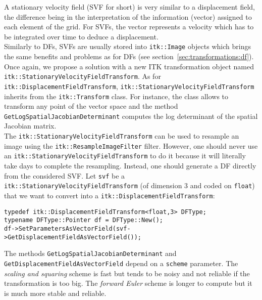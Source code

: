 A stationary velocity field (SVF for short) is very similar to a displacement field, the difference being in the interpretation of the information (vector) assigned to each element of the grid. For SVFs, the vector represents a velocity which has to be integrated over time to deduce a displacement.
\\
Similarly to DFs, SVFs are usually stored into \texttt{itk::Image} objects which brings the same benefits and problems as for DFs (see section~\ref{sec:transformations:df}). Once again, we propose a solution with a new ITK transformation object named \texttt{itk::\-Stationary\-Velocity\-Field\-Transform}. As for \texttt{itk::\-Displacement\-Field\-Transform}, \texttt{itk::\-Stationary\-Velocity\-Field\-Transform} inherits from the \texttt{itk::Transform} class. For instance, the class allows to transform any point of the vector space and the method \texttt{GetLogSpatialJacobianDeterminant} computes the log determinant of the spatial Jacobian matrix.
\\
The \texttt{itk::\-Stationary\-Velocity\-Field\-Transform} can be used to resample an image using the \texttt{itk::ResampleImageFilter} filter. However, one should never use an \texttt{itk::\-Stationary\-Velocity\-Field\-Transform} to do it because it will literally take days to complete the resampling. Instead, one should generate a DF directly from the considered SVF. Let \texttt{svf} be a \texttt{itk::\-Stationary\-Velocity\-Field\-Transform} (of dimension 3 and coded on \texttt{float}) that we want to convert into a \texttt{itk::\-Displacement\-Field\-Transform}:
%
\begin{lstlisting}
typedef itk::DisplacementFieldTransform<float,3> DFType;
typename DFType::Pointer df = DFType::New();
df->SetParametersAsVectorField(svf->GetDisplacementFieldAsVectorField());
\end{lstlisting}
%
The methods \texttt{GetLogSpatialJacobianDeterminant} and \texttt{GetDisplacementFieldAsVectorField} depend on a \texttt{scheme} parameter. The \textit{scaling and squaring} scheme is fast but tends to be noisy and not reliable if the transformation is too big. The \textit{forward Euler} scheme is longer to compute but it is much more stable and reliable.
















